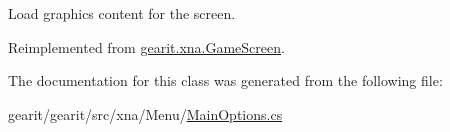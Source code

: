 Load graphics content for the screen. 



Reimplemented from \hyperlink{classgearit_1_1xna_1_1_game_screen_a7b4299ca1406c8d4ffcd2e479e83bef5}{gearit.\+xna.\+Game\+Screen}.



The documentation for this class was generated from the following file\+:\begin{DoxyCompactItemize}
\item 
gearit/gearit/src/xna/\+Menu/\hyperlink{xna_2_menu_2_main_options_8cs}{Main\+Options.\+cs}\end{DoxyCompactItemize}
